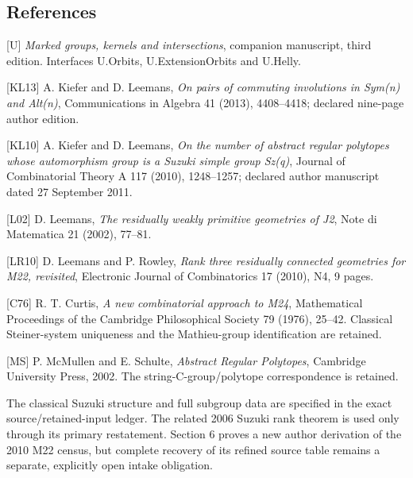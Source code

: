 \documentclass[
  11pt,
  a4paper,
]{article}
\begin{document}
\subsection{References}\label{references}

{[}U{]} \emph{Marked groups, kernels and intersections}, companion
manuscript, third edition. Interfaces U.Orbits, U.ExtensionOrbits and
U.Helly.

{[}KL13{]} A. Kiefer and D. Leemans, \emph{On pairs of commuting
involutions in Sym(n) and Alt(n)}, Communications in Algebra 41 (2013),
4408--4418; declared nine-page author edition.

{[}KL10{]} A. Kiefer and D. Leemans, \emph{On the number of abstract
regular polytopes whose automorphism group is a Suzuki simple group
Sz(q)}, Journal of Combinatorial Theory A 117 (2010), 1248--1257;
declared author manuscript dated 27 September 2011.

{[}L02{]} D. Leemans, \emph{The residually weakly primitive geometries
of J2}, Note di Matematica 21 (2002), 77--81.

{[}LR10{]} D. Leemans and P. Rowley, \emph{Rank three residually
connected geometries for M22, revisited}, Electronic Journal of
Combinatorics 17 (2010), N4, 9 pages.

{[}C76{]} R. T. Curtis, \emph{A new combinatorial approach to M24},
Mathematical Proceedings of the Cambridge Philosophical Society 79
(1976), 25--42. Classical Steiner-system uniqueness and the
Mathieu-group identification are retained.

{[}MS{]} P. McMullen and E. Schulte, \emph{Abstract Regular Polytopes},
Cambridge University Press, 2002. The string-C-group/polytope
correspondence is retained.

The classical Suzuki structure and full subgroup data are specified in
the exact source/retained-input ledger. The related 2006 Suzuki rank
theorem is used only through its primary restatement. Section 6 proves a
new author derivation of the 2010 M22 census, but complete recovery of
its refined source table remains a separate, explicitly open intake
obligation.
\end{document}
